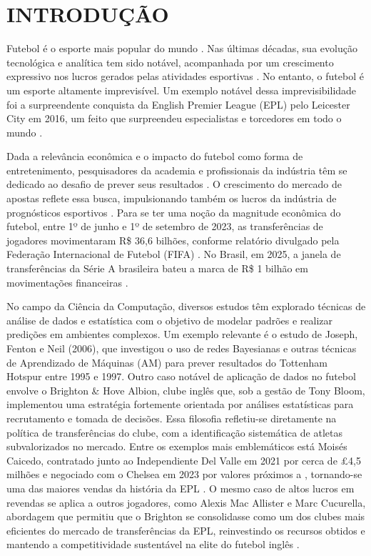 \chapter{INTRODUÇÃO}

Futebol é o esporte mais popular do mundo \cite{Almulla2023}. Nas últimas décadas, sua evolução tecnológica e analítica tem sido notável, 
acompanhada por um crescimento expressivo nos lucros gerados pelas atividades esportivas \cite{Rodrigues2022}. 
No entanto, o futebol é um esporte altamente imprevisível. Um exemplo notável dessa imprevisibilidade foi a surpreendente conquista da 
English Premier League (EPL) pelo Leicester City em 2016, um feito que surpreendeu especialistas e torcedores em todo o mundo \cite{Baboota2019}.

Dada a relevância econômica e o impacto do futebol como forma de entretenimento, pesquisadores da academia e profissionais da indústria têm se dedicado ao 
desafio de prever seus resultados \cite{Baboota2019}. O crescimento do mercado de apostas reflete essa busca, impulsionando também os lucros da indústria de 
prognósticos esportivos \cite{Rodrigues2022}. Para se ter uma noção da magnitude econômica do futebol, entre 1º de junho e 1º de setembro de 2023, as transferências 
de jogadores movimentaram R\$ 36,6 bilhões, conforme relatório divulgado pela Federação Internacional de Futebol (FIFA) \cite{Globo2023}. No Brasil, em 2025, 
a janela de transferências da Série A brasileira bateu a marca de R\$ 1 bilhão em movimentações financeiras \cite{Globo2025}.

No campo da Ciência da Computação, diversos estudos têm explorado técnicas de análise de dados e estatística com o objetivo de modelar padrões e realizar predições 
em ambientes complexos. Um exemplo relevante é o estudo de Joseph, Fenton e Neil (2006), que investigou o uso de redes Bayesianas e outras técnicas de Aprendizado 
de Máquinas (AM) para prever resultados do Tottenham Hotspur entre 1995 e 1997. Outro caso notável de aplicação de dados no futebol envolve o 
Brighton \& Hove Albion, clube inglês que, sob a gestão de Tony Bloom, implementou uma estratégia fortemente orientada por análises estatísticas para 
recrutamento e tomada de decisões. Essa filosofia refletiu-se diretamente na política de transferências do clube, 
com a identificação sistemática de atletas subvalorizados no mercado. Entre os exemplos mais emblemáticos está
Moisés Caicedo, contratado junto ao Independiente Del Valle em 2021 por cerca de \pounds4,5 milhões e negociado com o Chelsea em 2023 por valores próximos a 
, tornando-se uma das maiores vendas da história da EPL \cite{BBC2023Caicedo, CNN2023Caicedo}. O mesmo caso de altos lucros em revendas se aplica 
a outros jogadores, como Alexis Mac Allister e Marc Cucurella, abordagem que permitiu que o Brighton se consolidasse como um dos clubes 
mais eficientes do mercado de transferências da EPL, reinvestindo os recursos obtidos e mantendo a competitividade sustentável na elite do futebol inglês \cite{ESPN2023}.

